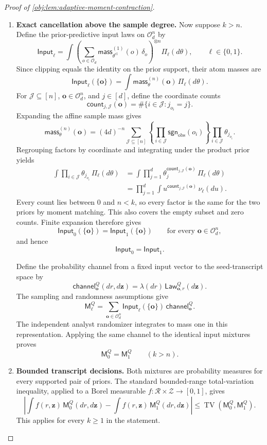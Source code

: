 \begin{proof}[Proof of \cref{obj:lem:adaptive-moment-contraction}]
\begin{enumerate}
\item \textbf{Exact cancellation above the sample degree.}
Now suppose \(k>n\). Define the prior-predictive input laws on
\(\mathcal O_d^n\) by
\[
\mathsf{Input}_\ell
=
\int
 \left(\sum_{o\in\mathcal O_d}
  \mathsf{mass}^{(1)}_{\theta^{\mathrm{cl}}}(o)\,\delta_o
 \right)^{\otimes n}
 \Pi_\ell(d\theta),
\qquad \ell\in\{0,1\}.
\]
Since clipping equals the identity on the prior support, their atom masses are
\[
\mathsf{Input}_\ell(\{\mathbf o\})
=\int\mathsf{mass}^{(n)}_\theta(\mathbf o)\,\Pi_\ell(d\theta).
\]
For \(\mathcal J\subseteq[n]\), \(\mathbf o\in\mathcal O_d^n\), and \(j\in[d]\), define the coordinate counts
\[
\mathsf{count}_{j,\mathcal J}(\mathbf o)
=\#\{i\in\mathcal J:j_{o_i}=j\}.
\]
Expanding the affine sample mass gives
\[
\mathsf{mass}^{(n)}_\theta(\mathbf o)
=
(4d)^{-n}
\sum_{\mathcal J\subseteq[n]}
 \left\{\prod_{i\in\mathcal J}\mathsf{sgn}_{\mathrm{obs}}(o_i)\right\}
 \prod_{i\in\mathcal J}\theta_{j_{o_i}}.
\]
Regrouping factors by coordinate and integrating under the product prior yields
\[
\begin{split}
\int\prod_{i\in\mathcal J}\theta_{j_{o_i}}\,\Pi_\ell(d\theta)
&=
\int\prod_{j=1}^d
 \theta_j^{\mathsf{count}_{j,\mathcal J}(\mathbf o)}
 \,\Pi_\ell(d\theta)\\
&=
\prod_{j=1}^d
 \int u^{\mathsf{count}_{j,\mathcal J}(\mathbf o)}\,\nu_\ell(du).
\end{split}
\]
Every count lies between \(0\) and \(n<k\), so every factor is the same for the two priors by moment matching. This also covers the empty subset and zero counts. Finite expansion therefore gives
\[
\mathsf{Input}_0(\{\mathbf o\})
=\mathsf{Input}_1(\{\mathbf o\})
\qquad
\text{for every \(\mathbf o\in\mathcal O_d^n\)},
\]
and hence
\[
\mathsf{Input}_0=\mathsf{Input}_1.
\]

Define the probability channel from a fixed input vector to the seed-transcript space by
\[
\mathsf{channel}^Q_{\mathbf o}(dr,d\mathbf z)
=\lambda(dr)\,\mathsf{Law}^Q_{\mathbf o,r}(d\mathbf z).
\]
The sampling and randomness assumptions give
\[
\mathsf M_\ell^Q
=
\sum_{\mathbf o\in\mathcal O_d^n}
 \mathsf{Input}_\ell(\{\mathbf o\})\,
 \mathsf{channel}^Q_{\mathbf o}.
\]
The independent analyst randomizer integrates to mass one in this representation. Applying the same channel to the identical input mixtures proves
\[
\mathsf M_0^Q=\mathsf M_1^Q
\qquad(k>n).
\]

\item \textbf{Bounded transcript decisions.}
Both mixtures are probability measures for every supported pair of priors. The standard bounded-range total-variation inequality, applied to a Borel measurable
\(f:\mathcal R\times\mathcal Z\to[0,1]\), gives
\[
\left|
\int f(r,\mathbf z)\,\mathsf M_0^Q(dr,d\mathbf z)
-
\int f(r,\mathbf z)\,\mathsf M_1^Q(dr,d\mathbf z)
\right|
\le
\operatorname{TV}(\mathsf M_0^Q,\mathsf M_1^Q).
\]
This applies for every \(k\ge1\) in the statement.
\end{enumerate}
\end{proof}
